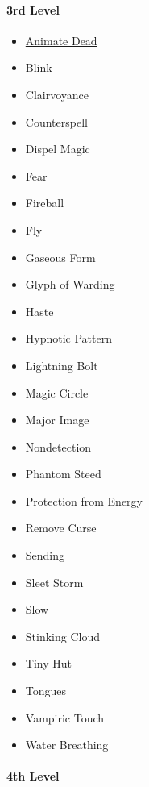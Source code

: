 \paragraph{3rd Level}\label{_3rd_level_3}

\begin{itemize}
\item
  \hyperref[spell-animate-dead]{Animate Dead}
\item
  Blink
\item
  Clairvoyance
\item
  Counterspell
\item
  Dispel Magic
\item
  Fear
\item
  Fireball
\item
  Fly
\item
  Gaseous Form
\item
  Glyph of Warding
\item
  Haste
\item
  Hypnotic Pattern
\item
  Lightning Bolt
\item
  Magic Circle
\item
  Major Image
\item
  Nondetection
\item
  Phantom Steed
\item
  Protection from Energy
\item
  Remove Curse
\item
  Sending
\item
  Sleet Storm
\item
  Slow
\item
  Stinking Cloud
\item
  Tiny Hut
\item
  Tongues
\item
  Vampiric Touch
\item
  Water Breathing
\end{itemize}

\paragraph{4th Level}\label{_4th_level_3}

